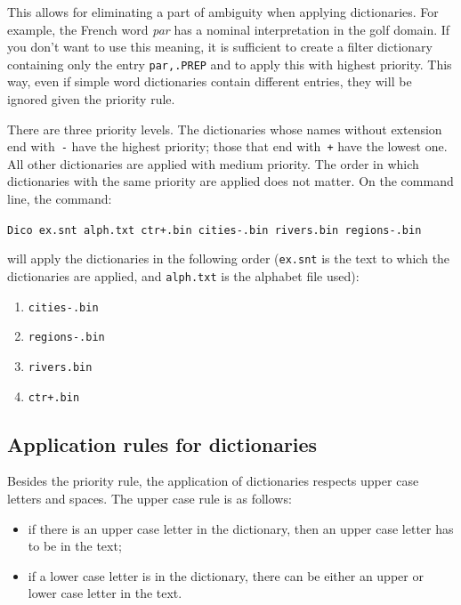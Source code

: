 \bigskip
\noindent This allows for eliminating a part of ambiguity when applying
dictionaries. For example, the French word \textit{par} has a nominal interpretation in the golf
domain. If you don't want to use this meaning, it is sufficient to create a
filter dictionary containing only the entry \verb$par,.PREP$ and to apply this
with highest priority. This way, even if simple word dictionaries contain 
different entries, they will be ignored given the priority rule.

\bigskip
\noindent There are three priority levels. The dictionaries whose names without
extension end with~\verb+-+
\index{\verb+-+}\index{\verb-+-}
have the highest priority; those that end with~\verb-+- have the lowest one.
All other dictionaries are applied with medium priority. The order in which
dictionaries with the same priority are applied does not matter.
On the command line, the command:

\bigskip
\noindent
\verb$Dico ex.snt alph.txt ctr+.bin cities-.bin rivers.bin regions-.bin$

\bigskip \noindent will apply the dictionaries in the following order
(\verb+ex.snt+ is the text to which the dictionaries are applied, and 
\verb+alph.txt+ is the alphabet file used):

\bigskip
\begin{enumerate}
  \item \verb$cities-.bin$
  \item \verb$regions-.bin$
  \item \verb$rivers.bin$
  \item \verb$ctr+.bin$
\end{enumerate}

\subsection{Application rules for dictionaries}
\label{section-transducer-application-rules}

Besides the priority rule, the application of dictionaries respects  upper  case
letters and spaces. The upper case rule is as follows:

\begin{itemize}
  \item if there is an upper case letter in the dictionary, then an upper case
  letter has to be in the text;
  
  \item if a lower case letter is in the dictionary, there can be either an upper
  or lower case letter in the text.
\end{itemize}

